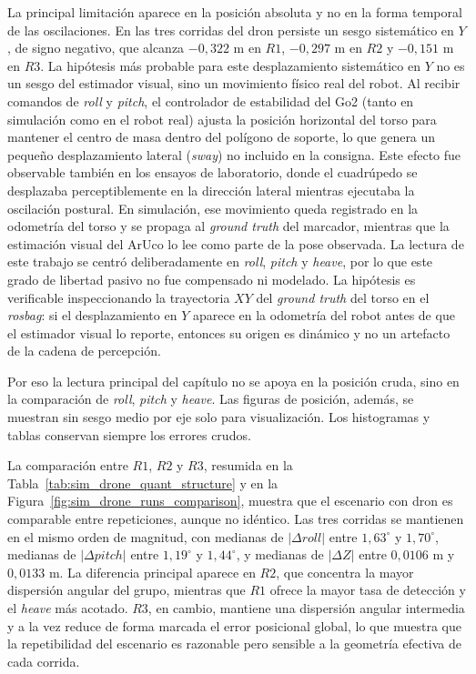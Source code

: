 \documentclass[12pt,a4paper]{report}
\begin{document}
La principal limitación aparece en la posición absoluta y no en la forma
temporal de las oscilaciones. En las tres corridas del dron persiste un sesgo
sistemático en \(Y\), de signo negativo, que alcanza
\(-0{,}322\) m en \(R1\), \(-0{,}297\) m en \(R2\) y \(-0{,}151\) m en \(R3\).
La hipótesis más probable para este desplazamiento sistemático en \(Y\) no es
un sesgo del estimador visual, sino un movimiento físico real del robot. Al
recibir comandos de \emph{roll} y \emph{pitch}, el controlador de estabilidad del Go2 (tanto
en simulación como en el robot real) ajusta la posición horizontal del torso
para mantener el centro de masa dentro del polígono de soporte, lo que genera
un pequeño desplazamiento lateral (\emph{sway}) no incluido en la consigna.
Este efecto fue observable también en los ensayos de laboratorio, donde el
cuadrúpedo se desplazaba perceptiblemente en la dirección lateral mientras
ejecutaba la oscilación postural. En simulación, ese movimiento queda registrado
en la odometría del torso y se propaga al \textit{ground truth} del marcador, mientras
que la estimación visual del ArUco lo lee como parte de la pose observada. La
lectura de este trabajo se centró deliberadamente en \emph{roll}, \emph{pitch} y \emph{heave}, por
lo que este grado de libertad pasivo no fue compensado ni modelado. La
hipótesis es verificable inspeccionando la trayectoria \(XY\) del \textit{ground truth}
del torso en el \emph{rosbag}: si el desplazamiento en \(Y\) aparece en la odometría
del robot antes de que el estimador visual lo reporte, entonces su origen es
dinámico y no un artefacto de la cadena de percepción.

Por eso la lectura principal del capítulo no se apoya en la posición cruda,
sino en la comparación de \emph{roll}, \emph{pitch} y \emph{heave}. Las
figuras de posición, además, se muestran sin sesgo medio por eje solo para
visualización. Los histogramas y tablas conservan siempre los errores crudos.

La comparación entre \(R1\), \(R2\) y \(R3\), resumida en la
Tabla~\ref{tab:sim_drone_quant_structure} y en la
Figura~\ref{fig:sim_drone_runs_comparison}, muestra que el escenario con dron
es comparable entre repeticiones, aunque no idéntico. Las tres corridas se
mantienen en el mismo orden de magnitud, con medianas de
\(|\Delta \mathit{roll}|\) entre \(1{,}63^\circ\) y \(1{,}70^\circ\), medianas de
\(|\Delta \mathit{pitch}|\) entre \(1{,}19^\circ\) y \(1{,}44^\circ\), y medianas de
\(|\Delta Z|\) entre \(0{,}0106\) m y \(0{,}0133\) m. La diferencia principal
aparece en \(R2\), que concentra la mayor dispersión angular del grupo, mientras
que \(R1\) ofrece la mayor tasa de detección y el \emph{heave} más acotado. \(R3\), en
cambio, mantiene una dispersión angular intermedia y a la vez reduce de forma
marcada el error posicional global, lo que muestra que la repetibilidad del
escenario es razonable pero sensible a la geometría efectiva de cada corrida.
\end{document}
